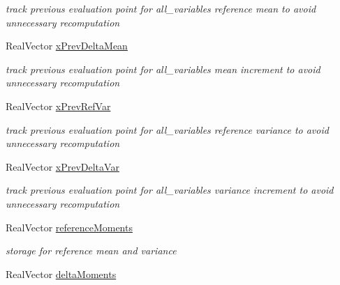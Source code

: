 \begin{DoxyCompactItemize}
\begin{DoxyCompactList}\small\item\em track previous evaluation point for all\+\_\+variables reference mean to avoid unnecessary recomputation \end{DoxyCompactList}\item 
Real\+Vector \hyperlink{classPecos_1_1HierarchInterpPolyApproximation_a960da983934f42a2571c51fd8dc25e33}{x\+Prev\+Delta\+Mean}\label{classPecos_1_1HierarchInterpPolyApproximation_a960da983934f42a2571c51fd8dc25e33}

\begin{DoxyCompactList}\small\item\em track previous evaluation point for all\+\_\+variables mean increment to avoid unnecessary recomputation \end{DoxyCompactList}\item 
Real\+Vector \hyperlink{classPecos_1_1HierarchInterpPolyApproximation_a2b975159e42ea87ebe6727b93b1fc910}{x\+Prev\+Ref\+Var}\label{classPecos_1_1HierarchInterpPolyApproximation_a2b975159e42ea87ebe6727b93b1fc910}

\begin{DoxyCompactList}\small\item\em track previous evaluation point for all\+\_\+variables reference variance to avoid unnecessary recomputation \end{DoxyCompactList}\item 
Real\+Vector \hyperlink{classPecos_1_1HierarchInterpPolyApproximation_ac3573871bc9b05ed0b0a2ced38ae1ff8}{x\+Prev\+Delta\+Var}\label{classPecos_1_1HierarchInterpPolyApproximation_ac3573871bc9b05ed0b0a2ced38ae1ff8}

\begin{DoxyCompactList}\small\item\em track previous evaluation point for all\+\_\+variables variance increment to avoid unnecessary recomputation \end{DoxyCompactList}\item 
Real\+Vector \hyperlink{classPecos_1_1HierarchInterpPolyApproximation_a6413a710bf4991e46c5d8c432f0be687}{reference\+Moments}\label{classPecos_1_1HierarchInterpPolyApproximation_a6413a710bf4991e46c5d8c432f0be687}

\begin{DoxyCompactList}\small\item\em storage for reference mean and variance \end{DoxyCompactList}\item 
Real\+Vector \hyperlink{classPecos_1_1HierarchInterpPolyApproximation_af3a11e9c5081889c8f29c70df515d5c5}{delta\+Moments}\label{classPecos_1_1HierarchInterpPolyApproximation_af3a11e9c5081889c8f29c70df515d5c5}


\end{DoxyCompactItemize}
